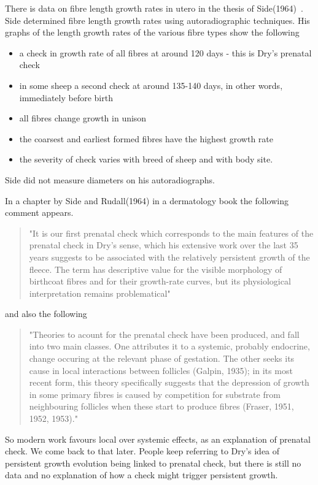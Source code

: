 \documentclass[titlepage]{article}  %
\begin{document}
There is data on fibre length growth rates in utero in the thesis of Side(1964)~\cite{side:64}. Side determined fibre length growth rates using autoradiographic techniques. His graphs of the length growth rates of the various fibre types show the following
\begin{itemize}
\item a check in growth rate of all fibres at around 120 days - this is Dry's prenatal check
\item in some sheep a second check at around 135-140 days, in other words, immediately before birth
\item all fibres change growth in unison
\item the coarsest and earliest formed fibres have the highest growth rate
\item the severity of check varies with breed of sheep and with body site.
\end{itemize}
Side did not measure diameters on his autoradiographs.

In a chapter by Side and Rudall(1964) in a dermatology book the following comment appears.
\begin{quote}
"It is our first prenatal check which corresponds to the main features of the prenatal check in Dry's sense, which his extensive work over the last 35 years suggests to be associated with the relatively persistent growth of the fleece. The term has descriptive value for the visible morphology of birthcoat fibres and for their growth-rate curves, but its physiological interpretation remains problematical"
\end{quote}
and also the following

\begin{quote}
"Theories to acount for the prenatal check have been produced, and fall into two main classes. One attributes it to a systemic, probably endocrine, change occuring at the relevant phase of gestation. The other seeks its cause in local interactions between follicles (Galpin, 1935); in its most recent form, this theory specifically suggests that the depression of growth in some primary fibres is caused by competition for substrate from neighbouring follicles when these start to produce fibres (Fraser, 1951, 1952, 1953)."
\end{quote}
 
So modern work favours local over  systemic effects, as an explanation of prenatal check.  We come back to that later. People keep referring to Dry's idea of persistent growth evolution being linked to prenatal check, but there is still no data and no explanation of how a check might trigger persistent growth. 
\end{document}

